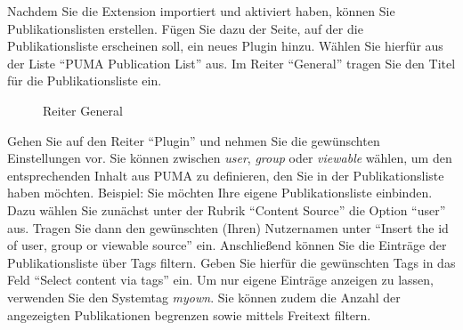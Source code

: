 Nachdem Sie die Extension importiert und aktiviert haben, können Sie Publikationslisten erstellen. Fügen Sie dazu der Seite, auf der die Publikationsliste erscheinen soll, ein neues Plugin hinzu. Wählen Sie hierfür aus der Liste \enquote{PUMA Publication List} aus.\newline
\newline
Im Reiter \enquote{General} tragen Sie den Titel für die Publikationsliste ein.
\begin{figure}[h!]
 \centering
 \caption{Reiter General}
 \label{figure130}
\end{figure}
\newline \newline
Gehen Sie auf den Reiter \enquote{Plugin} und nehmen Sie die gewünschten Einstellungen vor. Sie können zwischen \textit{user}, \textit{group} oder \textit{viewable} wählen, um den entsprechenden Inhalt aus PUMA zu definieren, den Sie in der Publikationsliste haben möchten.\newline
\newline
Beispiel: Sie möchten Ihre eigene Publikationsliste einbinden. Dazu wählen Sie zunächst unter der Rubrik \enquote{Content Source} die Option \enquote{user} aus. Tragen Sie dann den gewünschten (Ihren) Nutzernamen unter \enquote{Insert the id of user, group or viewable source} ein. Anschließend können Sie die Einträge der Publikationsliste über Tags filtern. Geben Sie hierfür die gewünschten Tags in das Feld \enquote{Select content via tags} ein. Um nur eigene Einträge anzeigen zu lassen, verwenden Sie den Systemtag \textit{myown}. Sie können zudem die Anzahl der angezeigten Publikationen begrenzen sowie mittels Freitext filtern.
